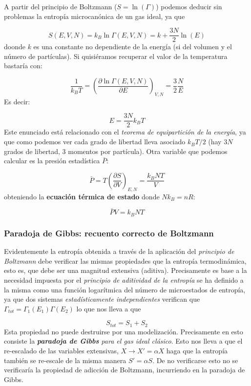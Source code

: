 \documentclass[12pt,a4paper]{article}
\numberwithin{equation}{section}
\numberwithin{figure}{section}
\newcommand{\parentesis}[1]{\left( #1  \right)}
\newcommand{\parciales}[2]{\frac{\partial #1}{\partial #2}}
\newcommand{\pparciales}[2]{\parentesis{\parciales{#1}{#2}}}
\theoremstyle{definition}
\begin{document}
A partir del principio de Boltzmann ($S=\ln (\Gamma)$) podemos deducir sin problemas la entropía microcanónica de un gas ideal, ya que

\begin{equation}
S(E,V,N) = k_B \ln \Gamma (E,V,N) = k + \frac{3N}{2} \ln (E)
\end{equation}
doonde $k$ es una constante no dependiente de la energía (si del volumen y el número de partículas). Si quisiéramos recuperar el valor de la temperatura bastaría con:

\begin{equation}
\frac{1}{k_B T} = \pparciales{\ln \Gamma (E,V,N)  }{E}_{V,N} = \frac{3}{2} \frac{N}{E}
\end{equation}
Es decir:

\begin{equation}
E = \frac{3N}{2} k_B T
\end{equation}
Este enunciado está relacionado con el \textit{teorema de equipartición de la energía}, ya que como podemos ver cada grado de libertad lleva asociado $k_BT/2$ (hay $3N$ grados de libertad, 3 momentos por partícula). Otra variable que podemos calcular es la presión estadística $\bar{P}$:

\begin{equation}
\bar{P} = T \pparciales{S}{V}_{E,N} = \frac{k_B N T}{V}
\end{equation}
obteniendo la \textbf{ecuación térmica de estado} donde $Nk_B = nR$:

\begin{equation}
\bar{P} V = k_B N T
\end{equation}

\subsubsection{Paradoja de Gibbs: recuento correcto de Boltzmann}

Evidentemente la entropía obtenida a través  de la aplicación del \textit{principio de Boltzmann} debe verificar las mismas propiedades que la entropía termodinámica, esto es, que debe ser una magnitud extensiva (aditiva). Precisamente es base a la necesidad impuesta por el \textit{principio de aditividad de la entropía} se ha definido a la misma como una función logarítmica del número de microestados de entropía, ya que dos sistemas \textit{estadísticamente independientes} verifican que $\Gamma_{tot} = \Gamma_1 (E_1) \Gamma(E_2)$ lo que nos lleva a que

\begin{equation}
S_{tot} = S_1 + S_2
\end{equation}
Esta propiedad no puede destruirse por una modelización. Precisamente en esto consiste la {\it \textbf{paradoja de Gibbs}  para el gas ideal clásico}. Esto nos lleva a que el re-escalado de las variables extensivas, $X \rightarrow X' = \alpha X$ haga que la entropía también se re-escale de la misma manera $S' = \alpha S$. De no verificarse esto no se verificaría la propiedad de adicción de Boltzmann, incurriendo en la paradoja de Gibbs.  \\
\end{document}
